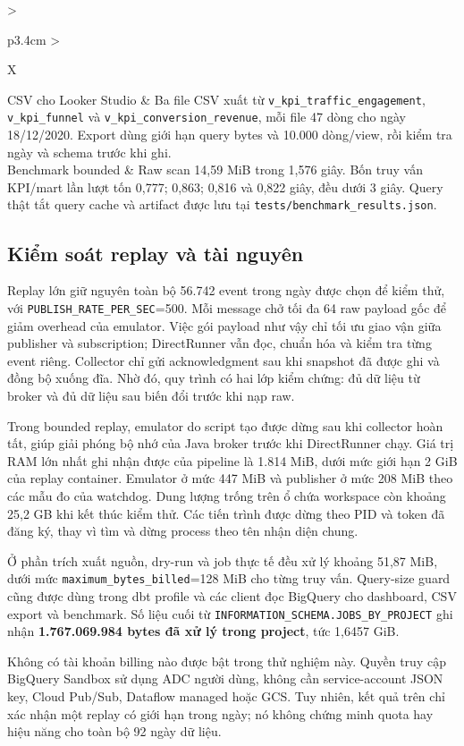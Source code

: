 \begin{xltabular}{\textwidth}{>{\raggedright\arraybackslash}p{3.4cm} >{\raggedright\arraybackslash}X}
CSV cho Looker Studio
& Ba file CSV xuất từ \texttt{v\_kpi\_traffic\_engagement}, \texttt{v\_kpi\_funnel} và \texttt{v\_kpi\_conversion\_revenue}, mỗi file 47 dòng cho ngày 18/12/2020. Export dùng giới hạn query bytes và 10.000 dòng/view, rồi kiểm tra ngày và schema trước khi ghi. \\

Benchmark bounded
& Raw scan 14,59 MiB trong 1,576 giây. Bốn truy vấn KPI/mart lần lượt tốn 0,777; 0,863; 0,816 và 0,822 giây, đều dưới 3 giây. Query thật tắt query cache và artifact được lưu tại \texttt{tests/benchmark\_results.json}. \\
\end{xltabular}

\subsection{Kiểm soát replay và tài nguyên}

Replay lớn giữ nguyên toàn bộ 56.742 event trong ngày được chọn để kiểm thử, với \texttt{PUBLISH\_RATE\_PER\_SEC}=500. Mỗi message chở tối đa 64 raw payload gốc để giảm overhead của emulator. Việc gói payload như vậy chỉ tối ưu giao vận giữa publisher và subscription; DirectRunner vẫn đọc, chuẩn hóa và kiểm tra từng event riêng. Collector chỉ gửi acknowledgment sau khi snapshot đã được ghi và đồng bộ xuống đĩa. Nhờ đó, quy trình có hai lớp kiểm chứng: đủ dữ liệu từ broker và đủ dữ liệu sau biến đổi trước khi nạp raw. \medskip

Trong bounded replay, emulator do script tạo được dừng sau khi collector hoàn tất, giúp giải phóng bộ nhớ của Java broker trước khi DirectRunner chạy. Giá trị RAM lớn nhất ghi nhận được của pipeline là 1.814 MiB, dưới mức giới hạn 2 GiB của replay container. Emulator ở mức 447 MiB và publisher ở mức 208 MiB theo các mẫu đo của watchdog. Dung lượng trống trên ổ chứa workspace còn khoảng 25,2 GB khi kết thúc kiểm thử. Các tiến trình được dừng theo PID và token đã đăng ký, thay vì tìm và dừng process theo tên nhận diện chung. \medskip

Ở phần trích xuất nguồn, dry-run và job thực tế đều xử lý khoảng 51,87 MiB, dưới mức \texttt{maximum\_bytes\_billed}=128 MiB cho từng truy vấn. Query-size guard cũng được dùng trong dbt profile và các client đọc BigQuery cho dashboard, CSV export và benchmark. Số liệu cuối từ \texttt{INFORMATION\_SCHEMA.JOBS\_BY\_PROJECT} ghi nhận \textbf{1.767.069.984 bytes đã xử lý trong project}, tức 1,6457 GiB. \medskip

Không có tài khoản billing nào được bật trong thử nghiệm này. Quyền truy cập BigQuery Sandbox sử dụng ADC người dùng, không cần service-account JSON key, Cloud Pub/Sub, Dataflow managed hoặc GCS. Tuy nhiên, kết quả trên chỉ xác nhận một replay có giới hạn trong ngày; nó không chứng minh quota hay hiệu năng cho toàn bộ 92 ngày dữ liệu.

